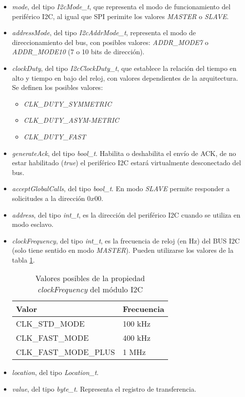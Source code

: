 \begin{itemize}
\item
\emph{mode}, del tipo \emph{I2cMode\_t}, que representa el modo de funcionamiento del periférico I2C, al igual que SPI perimite los valores \emph{MASTER} o \emph{SLAVE}.
\item
\emph{addressMode}, del tipo \emph{I2cAddrMode\_t}, representa el modo de direccionamiento del bus, con posibles valores: \emph{ADDR\_MODE7} o \emph{ADDR\_MODE10} (7 o 10 bits de dirección).
\item
\emph{clockDuty}, del tipo \emph{I2cClockDuty\_t}, que establece la relación del tiempo en alto y tiempo en bajo del reloj, con valores dependientes de la arquitectura. Se definen los posibles valores:
\begin{itemize}
\item
\emph{CLK\_DUTY\_SYMMETRIC}
\item
\emph{CLK\_DUTY\_ASYM-METRIC}
\item
\emph{CLK\_DUTY\_FAST}
\end{itemize}
\item
\emph{generateAck}, del tipo \emph{bool\_t}. Habilita o deshabilita el envío de ACK, de no estar habilitado (\emph{true}) el periférico I2C estará virtualmente desconectado del bus.
\item
\emph{acceptGlobalCalls}, del tipo \emph{bool\_t}. En modo \emph{SLAVE} permite responder a solicitudes a la dirección $0x00$.
\item
\emph{address}, del tipo \emph{int\_t}, es la dirección del periférico I2C cuando se utiliza en modo esclavo.
\item
\emph{clockFrequency}, del tipo \emph{int\_t}, es la frecuencia de reloj (en Hz) del BUS I2C (solo tiene sentido en modo \emph{MASTER}). Pueden utilizarse los valores de la tabla \ref{tab:i2cClockF}.

\begin{table}[h]
	\centering	
	\begin{tabular}{l l}   
		\toprule
		\textbf{Valor} & \textbf{Frecuencia} \\
		\midrule
      CLK\_STD\_MODE        & 100 kHz \\
      CLK\_FAST\_MODE       & 400 kHz \\
      CLK\_FAST\_MODE\_PLUS & 1 MHz   \\
		\bottomrule
		\hline
	\end{tabular}
	\caption[Valores posibles de la propiedad \emph{clockFrequency} del módulo I2C]{Valores posibles de la propiedad \emph{clockFrequency} del módulo I2C}
	\label{tab:i2cClockF}
\end{table}

\item
\emph{location}, del tipo \emph{Location\_t}.
\item
\emph{value}, del tipo \emph{byte\_t}. Representa el registro de transferencia.
\end{itemize}

